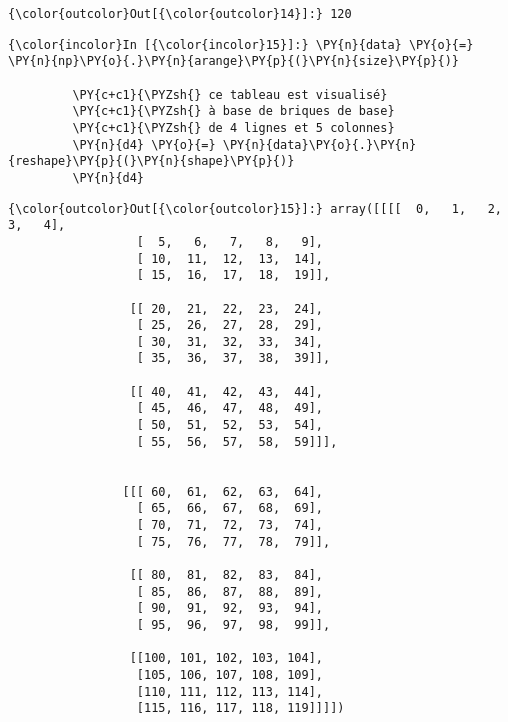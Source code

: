 \begin{Verbatim}[commandchars=\\\{\},frame=single,framerule=0.3mm,rulecolor=\color{cellframecolor}]
{\color{outcolor}Out[{\color{outcolor}14}]:} 120
\end{Verbatim}
            
    \begin{Verbatim}[commandchars=\\\{\},frame=single,framerule=0.3mm,rulecolor=\color{cellframecolor}]
{\color{incolor}In [{\color{incolor}15}]:} \PY{n}{data} \PY{o}{=} \PY{n}{np}\PY{o}{.}\PY{n}{arange}\PY{p}{(}\PY{n}{size}\PY{p}{)}
         
         \PY{c+c1}{\PYZsh{} ce tableau est visualisé}
         \PY{c+c1}{\PYZsh{} à base de briques de base}
         \PY{c+c1}{\PYZsh{} de 4 lignes et 5 colonnes}
         \PY{n}{d4} \PY{o}{=} \PY{n}{data}\PY{o}{.}\PY{n}{reshape}\PY{p}{(}\PY{n}{shape}\PY{p}{)}
         \PY{n}{d4}
\end{Verbatim}


\begin{Verbatim}[commandchars=\\\{\},frame=single,framerule=0.3mm,rulecolor=\color{cellframecolor}]
{\color{outcolor}Out[{\color{outcolor}15}]:} array([[[[  0,   1,   2,   3,   4],
                  [  5,   6,   7,   8,   9],
                  [ 10,  11,  12,  13,  14],
                  [ 15,  16,  17,  18,  19]],
         
                 [[ 20,  21,  22,  23,  24],
                  [ 25,  26,  27,  28,  29],
                  [ 30,  31,  32,  33,  34],
                  [ 35,  36,  37,  38,  39]],
         
                 [[ 40,  41,  42,  43,  44],
                  [ 45,  46,  47,  48,  49],
                  [ 50,  51,  52,  53,  54],
                  [ 55,  56,  57,  58,  59]]],
         
         
                [[[ 60,  61,  62,  63,  64],
                  [ 65,  66,  67,  68,  69],
                  [ 70,  71,  72,  73,  74],
                  [ 75,  76,  77,  78,  79]],
         
                 [[ 80,  81,  82,  83,  84],
                  [ 85,  86,  87,  88,  89],
                  [ 90,  91,  92,  93,  94],
                  [ 95,  96,  97,  98,  99]],
         
                 [[100, 101, 102, 103, 104],
                  [105, 106, 107, 108, 109],
                  [110, 111, 112, 113, 114],
                  [115, 116, 117, 118, 119]]]])
\end{Verbatim}
            
